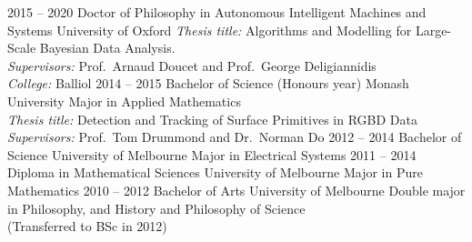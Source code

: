 \documentclass[9pt]{developercv} %
\begin{document}



\begin{entrylist}
  \entry
    {2015 -- 2020}
    {Doctor of Philosophy in Autonomous Intelligent Machines and Systems}
    {University of Oxford}
    {\textit{Thesis title:} Algorithms and Modelling for Large-Scale Bayesian Data Analysis. \\
    \textit{Supervisors:} Prof.\ Arnaud Doucet and Prof.\ George Deligiannidis\\
    \textit{College:} Balliol}
  \entry
    {2014 -- 2015}
    {Bachelor of Science (Honours year)}
    {Monash University}
    {Major in Applied Mathematics \\
    \textit{Thesis title:} Detection and Tracking of Surface Primitives in RGBD Data\\
    \textit{Supervisors:} Prof.\ Tom Drummond and Dr.\ Norman Do}
  \entry
    {2012 -- 2014}
    {Bachelor of Science}
    {University of Melbourne}
    {Major in Electrical Systems}
  \entry
    {2011 -- 2014}
    {Diploma in Mathematical Sciences}
    {University of Melbourne}
    {Major in Pure Mathematics}
  \entry
    {2010 -- 2012}
    {Bachelor of Arts}
    {University of Melbourne}
    {Double major in Philosophy, and History and Philosophy of Science\\(Transferred to BSc in 2012)}
\end{entrylist}
\end{document}
